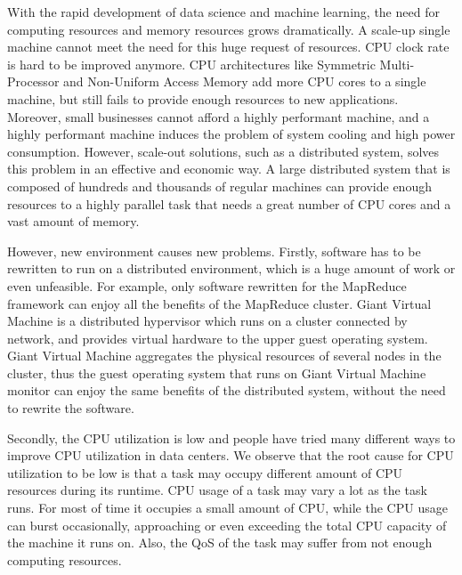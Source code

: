 \begin{bigabstract}

With the rapid development of data science and machine learning, the need for computing resources and memory resources grows dramatically. A scale-up single machine cannot meet the need for this huge request of resources. CPU clock rate is hard to be improved anymore. CPU architectures like Symmetric Multi-Processor and Non-Uniform Access Memory add more CPU cores to a single machine, but still fails to provide enough resources to new applications. Moreover, small businesses cannot afford a highly performant machine, and a highly performant machine induces the problem of system cooling and high power consumption. However, scale-out solutions, such as a distributed system, solves this problem in an effective and economic way. A large distributed system that is composed of hundreds and thousands of regular machines can provide enough resources to a highly parallel task that needs a great number of CPU cores and a vast amount of memory. 

However, new environment causes new problems. Firstly, software has to be rewritten to run on a distributed environment, which is a huge amount of work or even unfeasible. For example, only software rewritten for the MapReduce framework can enjoy all the benefits of the MapReduce cluster. Giant Virtual Machine is a distributed hypervisor which runs on a cluster connected by network, and provides virtual hardware to the upper guest operating system. Giant Virtual Machine aggregates the physical resources of several nodes in the cluster, thus the guest operating system that runs on Giant Virtual Machine monitor can enjoy the same benefits of the distributed system, without the need to rewrite the software.

Secondly, the CPU utilization is low and people have tried many different ways to improve CPU utilization in data centers. We observe that the root cause for CPU utilization to be low is that a task may occupy different amount of CPU resources during its runtime. CPU usage of a task may vary a lot as the task runs. For most of time it occupies a small amount of CPU, while the CPU usage can burst occasionally, approaching or even exceeding the total CPU capacity of the machine it runs on. Also, the QoS of the task may suffer from not enough computing resources. 


\end{bigabstract}
